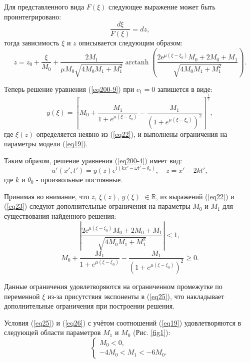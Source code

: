 \documentclass[14pt,a4paper]{extreport}
\DeclareMathOperator\arctanh{arctanh}
\begin{document}
			Для представленного вида \(F(\xi)\) следующее выражение может быть проинтегрировано:
			\begin{equation}
				\frac{d \xi}{F(\xi)}=dz,
			\end{equation}
			тогда зависимость \(\xi\) и \(z\) описывается следующим образом:
			\begin{equation} \label{eq22}
				z=z_{0}+\frac{\xi}{M_{0}}+\frac{2 M_{1}}{\mu M_{0} \sqrt{4 M_{0} M_{1}+M_{1}^{2}}} \arctanh \left(\frac{2 {\mathrm e}^{\mu (\xi-\xi_{0})} M_{0}+2 M_{0}+M_{1}}{\sqrt{4 M_{0} M_{1}+M_{1}^{2}}}\right).
			\end{equation}

			Теперь решение уравнения (\ref{eq200-9}) при \(c_{1}=0\) запишется в виде:
			\begin{equation}\label{eq23}
				y(\xi)=\left[ M_{0}+\frac{M_{1}}{1+e^{\mu(\xi-\xi_{0})}}-\frac{M_{1}}{\left(1+e^{\mu\left(\xi-\xi_{0}\right)}\right)^{2}}\right]^{\frac{1}{2}},
			\end{equation}
			где \(\xi(z)\) определяется неявно из (\ref{eq22}), и выполнены ограничения на параметры модели (\ref{eq19}).

			Таким образом, решение уравнения (\ref{eq200-4}) имеет вид:
			\begin{equation}\label{eq24}
				u'(x',t')=y(z)e^{i(kx'-\omega t'-\theta_{0})}, \quad z=x'-2kt',
			\end{equation}
			где \(k\) и \(\theta_{0}\) - произвольные постоянные. 

			Принимая во внимание, что \(z\), \(\xi (z)\), \(y(\xi)\) \(\in \mathbb{R}\), из выражений (\ref{eq22}) и (\ref{eq23}) следуют дополнительные ограничения на параметры \(M_{0}\) и \(M_{1}\) для существования найденного решения:
			\begin{equation} \label{eq25}
				\left|\frac{2 {\mathrm e}^{\mu (\xi-\xi_{0})} M_{0}+2 M_{0}+M_{1}}{\sqrt{4 M_{0} M_{1}+M_{1}^{2}}}\right|< 1,
			\end{equation}
			\begin{equation} \label{eq26}
				M_{0}+\frac{M_{1}}{1+e^{\mu(\xi-\xi_{0})}}-\frac{M_{1}}{\left(1+e^{\mu(\xi-\xi_{0})}\right)^{2}}\ge 0.
			\end{equation}

			Данные ограничения удовлетворяются на ограниченном промежутке по переменной \(\xi\) из-за присутствия экспоненты в (\ref{eq25}), что накладывает дополнительные ограничения при построении решения.

			Условия (\ref{eq25}) и (\ref{eq26}) с учётом соотношений (\ref{eq19}) удовлетворяются в следующей области параметров \(M_{1}\) и \( M_{0}\) (Рис. \ref{fig1}):
			\begin{equation} \label{eq27}
				\begin{cases}
					M_{0}<0,\\
					-4 M_{0} < M_{1} < -6 M_{0}.
				\end{cases}
			\end{equation}
\end{document}

